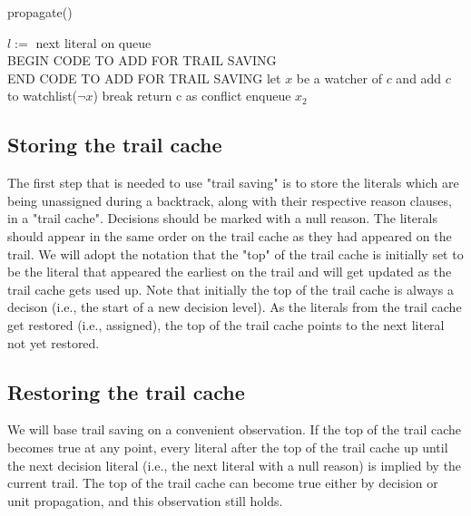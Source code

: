 \documentclass{article}
\begin{document}
	\begin{algorithm}
  	\caption{propagate()}
	\begin{algorithmic}[1]
	\STATE $l := $ next literal on queue
	\\BEGIN CODE TO ADD FOR TRAIL SAVING
				\ENDIF
			\ENDWHILE
		\ENDIF
	\ENDIF
	\\END CODE TO ADD FOR TRAIL SAVING
				\STATE let $x$ be a watcher of $c$ and add $c$ to watchlist($\neg x$)
				\STATE break
			\ENDIF
		\ENDFOR
				\STATE return c as conflict
				\STATE enqueue $x_2$
			\ENDIF
		\ENDIF
	\ENDFOR
	\ENDWHILE
	\end{algorithmic}
	\end{algorithm}
\clearpage

\subsection{Storing the trail cache}
The first step that is needed to use "trail saving" is to store the literals which are being unassigned during a backtrack, along with their respective reason clauses, in a "trail cache". Decisions should be marked with a null reason. The literals should appear in the same order on the trail cache as they had appeared on the trail. We will adopt the notation that the "top" of the trail cache is initially set to be the literal that appeared the earliest on the trail and will get updated as the trail cache gets used up. Note that initially the top of the trail cache is always a decison (i.e., the start of a new decision level). As the literals from the trail cache get restored (i.e., assigned), the top of the trail cache points to the next literal not yet restored.

\subsection{Restoring the trail cache}
We will base trail saving on a convenient observation. If the top of the trail cache becomes true at any point, every literal after the top of the trail cache up until the next decision literal (i.e., the next literal with a null reason) is implied by the current trail. The top of the trail cache can become true either by decision or unit propagation, and this observation still holds.\newline
\end{document}
